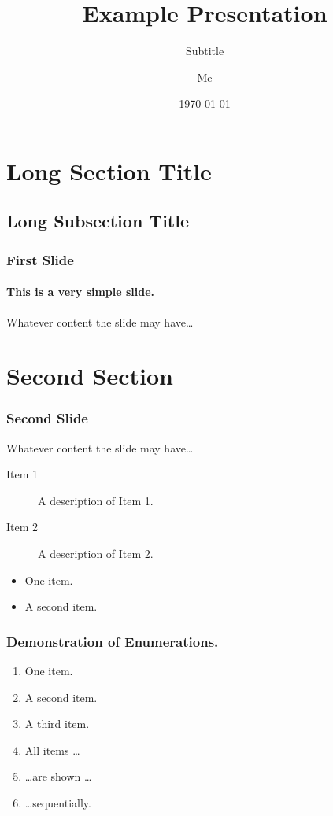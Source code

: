 \documentclass[12pt]{beamer}            %
\title[short title]{Example Presentation}
\subtitle[short subtitle]{Subtitle}
\author[abbreviated name]{Me}
\institute[short name]{Long Institute Name}
\date{\today}
\begin{document}
\frame{\titlepage}


\section[short title]{Long Section Title}
\subsection[short title]{Long Subsection Title}
\begin{frame}                       %
    \frametitle{First Slide}
    \framesubtitle{This is a very simple slide.}
    Whatever content the slide may have\ldots
\end{frame}

\section{Second Section}
\begin{frame}
    \frametitle{Second Slide}
    Whatever content the slide may have\ldots
\end{frame}

\begin{frame}
    \begin{description}
        \item[Item 1] A description of Item 1.
        \item[Item 2] A description of Item 2.
    \end{description}
\end{frame}

\begin{frame}
    \begin{itemize}
        \item One item.
        \item A second item.
    \end{itemize}
\end{frame}

\begin{frame}
    \frametitle{Demonstration of Enumerations.}
    \begin{enumerate}
        \item One item.
            \pause
        \item A second item.
            \pause
        \item A third item.
            \pause
        \item All items \ldots
            \pause
        \item \ldots are shown \ldots
            \pause
        \item \ldots sequentially.
    \end{enumerate}
\end{frame}
\end{document}
